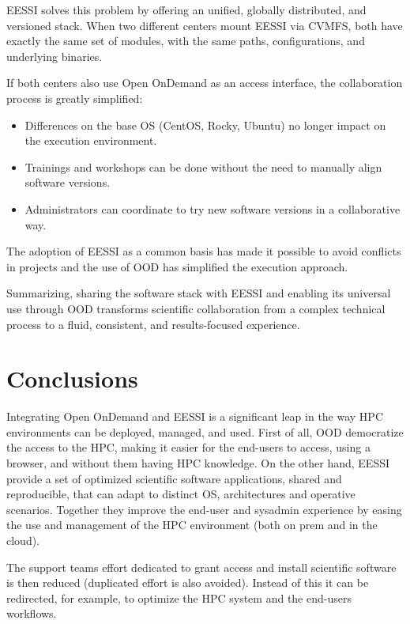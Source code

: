 \documentclass[11pt,a4paper]{article}
\begin{document}
EESSI solves this problem by offering an unified, globally distributed, and versioned stack. When two different centers mount EESSI via CVMFS, both have exactly the same set of modules, with the same paths, configurations, and underlying binaries.

If both centers also use Open OnDemand as an access interface, the collaboration process is greatly simplified:

\begin{itemize}
    \item Differences on the base OS (CentOS, Rocky, Ubuntu) no longer impact on the execution environment.
    \item Trainings and workshops can be done without the need to manually align software versions.
    \item Administrators can coordinate to try new software versions in a collaborative way.
\end{itemize}

The adoption of EESSI as a common basis has made it possible to avoid conflicts in projects and the use of OOD has simplified the execution approach.

Summarizing, sharing the software stack with EESSI and enabling its universal use through OOD transforms scientific collaboration from a complex technical process to a fluid, consistent, and results-focused experience.

\section{Conclusions}

Integrating Open OnDemand and EESSI is a significant leap in the way HPC environments can be deployed, managed, and used. First of all, OOD democratize the access to the HPC, making it easier for the end-users to access, using a browser, and without them having HPC knowledge. On the other hand, EESSI provide a set of optimized scientific software applications, shared and reproducible, that can adapt to distinct OS, architectures and operative scenarios. Together they improve the end-user and sysadmin experience by easing the use and management of the HPC environment (both on prem and in the cloud).

The support teams effort dedicated to grant access and install scientific software is then reduced (duplicated effort is also avoided). Instead of this it can be redirected, for example, to optimize the HPC system and the end-users workflows.
\end{document}

